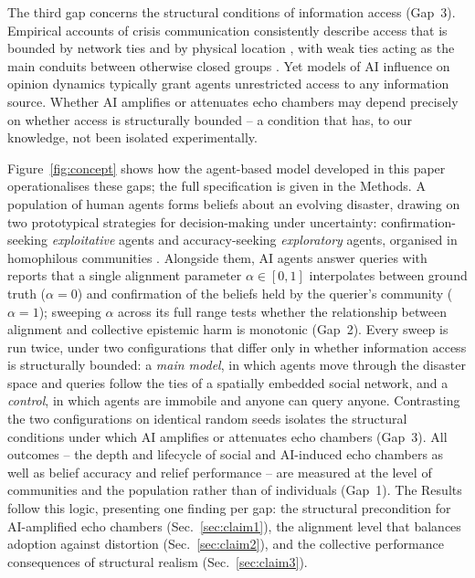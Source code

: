\documentclass[pdflatex,sn-basic]{sn-jnl}
\begin{document}
The third gap concerns the structural conditions of information access (Gap~3). Empirical accounts of crisis communication consistently describe access that is bounded by network ties and by physical location \citep{pan2012crisis,holguin2012unique,wolbers2018introducing}, with weak ties acting as the main conduits between otherwise closed groups \citep{granovetter1973strength}. Yet models of AI influence on opinion dynamics typically grant agents unrestricted access to any information source. Whether AI amplifies or attenuates echo chambers may depend precisely on whether access is structurally bounded -- a condition that has, to our knowledge, not been isolated experimentally.

Figure~\ref{fig:concept} shows how the agent-based model developed in this paper operationalises these gaps; the full specification is given in the Methods. A population of human agents forms beliefs about an evolving disaster, drawing on two prototypical strategies for decision-making under uncertainty: confirmation-seeking \emph{exploitative} agents and accuracy-seeking \emph{exploratory} agents, organised in homophilous communities \citep{mcpherson2001birds,comes2020coordination}. Alongside them, AI agents answer queries with reports that a single alignment parameter $\alpha \in [0,1]$ interpolates between ground truth ($\alpha = 0$) and confirmation of the beliefs held by the querier's community ($\alpha = 1$); sweeping $\alpha$ across its full range tests whether the relationship between alignment and collective epistemic harm is monotonic (Gap~2). Every sweep is run twice, under two configurations that differ only in whether information access is structurally bounded: a \emph{main model}, in which agents move through the disaster space and queries follow the ties of a spatially embedded social network, and a \emph{control}, in which agents are immobile and anyone can query anyone. Contrasting the two configurations on identical random seeds isolates the structural conditions under which AI amplifies or attenuates echo chambers (Gap~3). All outcomes -- the depth and lifecycle of social and AI-induced echo chambers as well as belief accuracy and relief performance -- are measured at the level of communities and the population rather than of individuals (Gap~1). The Results follow this logic, presenting one finding per gap: the structural precondition for AI-amplified echo chambers (Sec.~\ref{sec:claim1}), the alignment level that balances adoption against distortion (Sec.~\ref{sec:claim2}), and the collective performance consequences of structural realism (Sec.~\ref{sec:claim3}).
\end{document}
